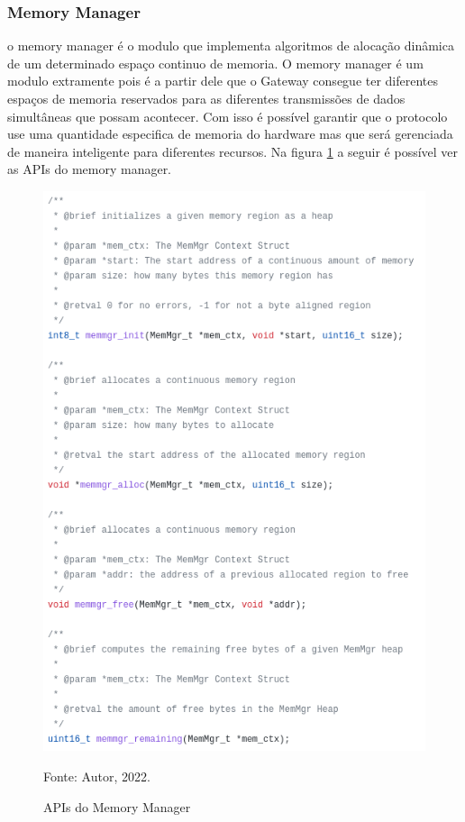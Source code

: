 \subsubsection{Memory Manager}

o memory manager é o modulo que implementa algoritmos de alocação dinâmica de um determinado espaço
continuo de memoria. O memory manager é um modulo extramente pois é a partir dele que o Gateway consegue
ter diferentes espaços de memoria reservados para as diferentes transmissões de dados simultâneas que possam acontecer. Com isso é possível garantir que o protocolo use uma quantidade especifica de memoria do hardware mas que será gerenciada de maneira inteligente para diferentes recursos. Na figura \ref{fig:code-memmgr-api} a seguir é possível ver as APIs do memory manager.

\begin{figure}[H]
    \centering
	\caption{APIs do Memory Manager}
    \includegraphics[height=0.55\textheight,keepaspectratio]{img/memmgr-api.png}
    \label{fig:code-memmgr-api}
    
    Fonte: Autor, 2022.
\end{figure}

